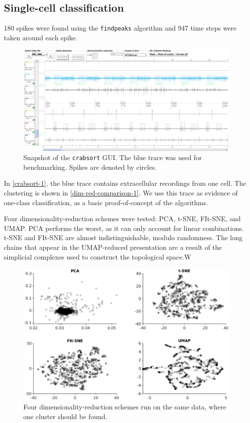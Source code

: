 \documentclass{article}
\begin{document}
\subsection{Single-cell classification}

180 spikes were found using the \texttt{findpeaks} algorithm
and 947 time steps were taken around each spike.

\begin{figure}
  \centering
  \includegraphics[width=\textwidth]{gfx/crabsort-1.eps}
  \caption{Snapshot of the \texttt{crabsort} GUI. The blue trace was used for benchmarking. Spikes are denoted by circles.}
  \label{fig:crabsort-1}
\end{figure}

In \ref{crabsort-1}, the blue trace contains extracellular recordings from one cell.
The clustering is shown in \ref{dim-red-comparison-1}.
We use this trace as evidence of one-class classification,
as a basic proof-of-concept of the algorithms.

Four dimensionality-reduction schemes were tested: PCA, t-SNE, FIt-SNE, and UMAP.
PCA performs the worst, as it can only account for linear combinations.
t-SNE and FIt-SNE are almost indistinguishable, modulo randomness.
The long chains that appear in the UMAP-reduced presentation are a result of
the simplicial complexes used to construct the topological space.W

\begin{figure}
  \centering
  \includegraphics[width=\textwidth]{gfx/dim-red-1.eps}
  \caption{Four dimensionality-reduction schemes run on the same data, where one cluster should be found.}
  \label{fig:dim-red-comparison-1}
\end{figure}
\end{document}
